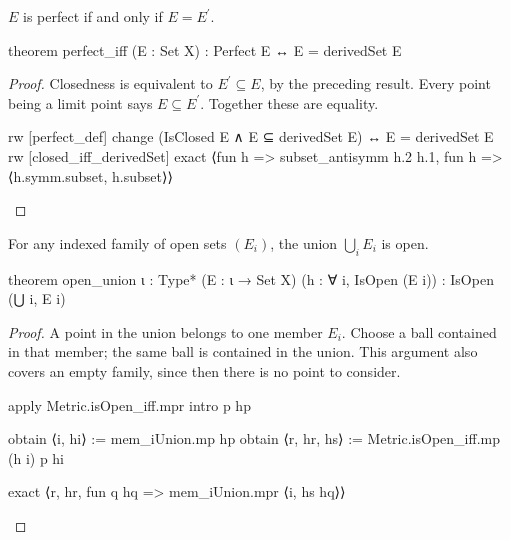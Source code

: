 \begin{lemma}
  \label{an1:lem:perfect-iff}
  $E$ is perfect if and only if $E=E^{\prime}$.

  \begin{lean}
    theorem perfect_iff (E : Set X) : Perfect E ↔ E = derivedSet E
  \end{lean}
\end{lemma}

\begin{proof}
  Closedness is equivalent to $E^{\prime}\subseteq E$, by the preceding result.
  Every point being a limit point says $E\subseteq E^{\prime}$.
  Together these are equality.

  \begin{lean}
    rw [perfect_def]
    change (IsClosed E ∧ E ⊆ derivedSet E) ↔ E = derivedSet E
    rw [closed_iff_derivedSet]
    exact ⟨fun h => subset_antisymm h.2 h.1, fun h => ⟨h.symm.subset, h.subset⟩⟩
  \end{lean}
\end{proof}

\begin{proposition}
  \label{an1:thm:arbitrary-union-of-open-sets-is-open}
  For any indexed family of open sets $(E_i)$, the union $\bigcup_i E_i$ is open.

  \begin{lean}
    theorem open_union {ι : Type*} (E : ι → Set X)
        (h : ∀ i, IsOpen (E i)) : IsOpen (⋃ i, E i)
  \end{lean}
\end{proposition}

\begin{proof}
  A point in the union belongs to one member $E_i$.
  Choose a ball contained in that member; the same ball is contained in the union.
  This argument also covers an empty family, since then there is no point to consider.

  \begin{lean}
    apply Metric.isOpen_iff.mpr
    intro p hp

    obtain ⟨i, hi⟩ := mem_iUnion.mp hp
    obtain ⟨r, hr, hs⟩ := Metric.isOpen_iff.mp (h i) p hi

    exact ⟨r, hr, fun q hq => mem_iUnion.mpr ⟨i, hs hq⟩⟩
  \end{lean}

\end{proof}

